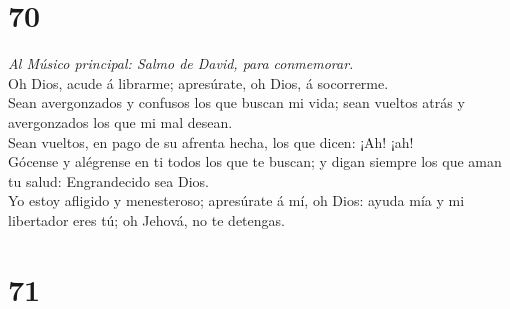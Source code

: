 \hypertarget{section-69}{%
\section{70}\label{section-69}}

 \emph{Al Músico principal: Salmo de David, para
conmemorar.}\\
Oh Dios, acude á librarme; apresúrate, oh Dios, á socorrerme.\\
 Sean avergonzados y confusos los que buscan mi vida; sean
vueltos atrás y avergonzados los que mi mal desean.\\
 Sean vueltos, en pago de su afrenta hecha, los que dicen:
¡Ah! ¡ah!\\
 Gócense y alégrense en ti todos los que te buscan; y digan
siempre los que aman tu salud: Engrandecido sea Dios.\\
 Yo estoy afligido y menesteroso; apresúrate á mí, oh Dios:
ayuda mía y mi libertador eres tú; oh Jehová, no te detengas.

\hypertarget{section-70}{%
\section{71}\label{section-70}}

